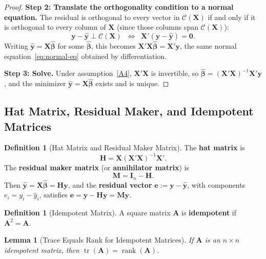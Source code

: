 \documentclass[14pt]{extarticle}
\theoremstyle{plain}
\newtheorem{lemma}[theorem]{Lemma}
\theoremstyle{definition}
\newtheorem{definition}[theorem]{Definition}
\theoremstyle{remark}
\DeclareMathOperator\tr{tr}
\DeclareMathOperator\rank{rank}
\newcommand{\ifff}{\;\Longleftrightarrow\;}
\newcommand{\bX}{\mathbf{X}}
\newcommand{\by}{\mathbf{y}}
\def\bb{\boldsymbol{\beta}}
\newcommand{\bI}{\mathbf{I}}
\newcommand{\bH}{\mathbf{H}}
\newcommand{\bM}{\mathbf{M}}
\newcommand{\bzero}{\mathbf{0}}
\newcommand{\bA}{\mathbf{A}}
\newcommand{\calC}{\mathcal{C}}
\begin{document}
\begin{proof}
\textbf{Step 2: Translate the orthogonality condition to a normal equation.} The residual is orthogonal to every vector in $\calC(\bX)$ if and only if it is orthogonal to every column of $\bX$ (since those columns span $\calC(\bX)$):
\[
\by - \hat{\by} \perp \calC(\bX) \;\ifff\; \bX'(\by - \hat{\by}) = \bzero.
\]
Writing $\hat{\by} = \bX\hat{\bb}$ for some $\hat{\bb}$, this becomes $\bX'\bX\hat{\bb} = \bX'\by$, the same normal equation~\eqref{eq:normal-eq} obtained by differentiation.

\textbf{Step 3: Solve.} Under assumption~\ref{A4}, $\bX'\bX$ is invertible, so $\hat{\bb} = (\bX'\bX)^{-1}\bX'\by$, and the minimizer $\hat{\by} = \bX\hat{\bb}$ exists and is unique.
\end{proof}

\subsection{Hat Matrix, Residual Maker, and Idempotent Matrices}

\begin{definition}[Hat Matrix and Residual Maker Matrix]\label{def:hat-matrix}
The \textbf{hat matrix} is
\begin{equation}
\bH = \bX(\bX'\bX)^{-1}\bX'.
\end{equation}
The \textbf{residual maker matrix} (or \textbf{annihilator matrix}) is
\begin{equation}
\bM = \bI_n - \bH.
\end{equation}
Then $\hat{\by} = \bX\hat{\bb} = \bH\by$, and the \textbf{residual vector} $\mathbf{e} := \by - \hat{\by}$, with components $e_i = y_i - \hat{y}_i$, satisfies $\mathbf{e} = \by - \bH\by = \bM\by$.
\end{definition}

\begin{definition}[Idempotent Matrix]\label{def:idempotent}
A square matrix $\bA$ is \textbf{idempotent} if $\bA^2 = \bA$.
\end{definition}

\begin{lemma}[Trace Equals Rank for Idempotent Matrices]\label{lem:idempotent}
If $\bA$ is an $n \times n$ idempotent matrix, then $\tr(\bA) = \rank(\bA)$.
\end{lemma}
\end{document}
